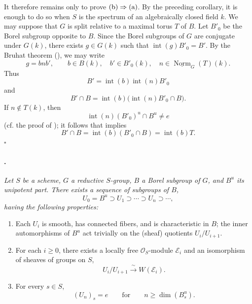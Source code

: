 It therefore remains only to prove
\(\textup{(b)}\Rightarrow\textup{(a)}\). By the preceding corollary,
it is enough to do so when \(S\) is the spectrum of an algebraically
closed field \(k\). We may suppose that \(G\) is split relative to a
maximal torus \(T\) of \(B\). Let \(B'_0\) be the Borel subgroup
opposite to \(B\). Since the Borel subgroups of \(G\) are conjugate
under \(G(k)\), there exists \(g\in G(k)\) such that
\(\operatorname{int}(g)B'_0=B'\). By the Bruhat theorem
\textup{()}, we may write
\[
  g=bnb',
  \qquad
  b\in B(k),\quad
  b'\in B'_0(k),\quad
  n\in\underline{\operatorname{Norm}}_G(T)(k).
\]
Thus
\[
  B'=\operatorname{int}(b)\operatorname{int}(n)B'_0
\]
and
\[
  B'\cap B
  =
  \operatorname{int}(b)
  \bigl(\operatorname{int}(n)B'_0\cap B\bigr).
\]
If \(n\notin T(k)\), then
\[
  \operatorname{int}(n)(B'_0)^u\cap B^u\ne e
\]
\textup{(cf. the proof of )}; it follows that
\textup{} implies
\[
  B'\cap B
  =
  \operatorname{int}(b)(B'_0\cap B)
  =
  \operatorname{int}(b)T.
\]
\hfill\(\square\)

\paragraph{.}
{\itshape Let \(S\) be a scheme, \(G\) a reductive \(S\)-group,
\(B\) a Borel subgroup of \(G\), and \(B^u\) its unipotent part.
There exists a sequence of subgroups of \(B\),
\[
  U_0=B^u\supset U_1\supset\cdots\supset U_n\supset\cdots,
\]
having the following properties:
\begin{enumerate}
\item[\textup{(i)}] Each \(U_i\) is smooth, has connected fibers,
and is characteristic in \(B\); the inner automorphisms of \(B^u\)
act trivially on the \textup{(sheaf)} quotients \(U_i/U_{i+1}\).

\item[\textup{(ii)}] For each \(i\geq 0\), there exists a locally
free \(\mathcal O_S\)-module \(\mathcal E_i\) and an isomorphism of
sheaves of groups on \(S\),
\[
  U_i/U_{i+1}\xrightarrow{\;\sim\;}W(\mathcal E_i).
\]

\item[\textup{\SGAInlineRefTarget{sga3:xxii:prop:5.9.5:item:iii}(iii)}] For every \(s\in S\),
\[
  (U_n)_s=e
  \qquad\text{for}\qquad
  n\geq\dim(B^u_s).
\]
\end{enumerate}}

